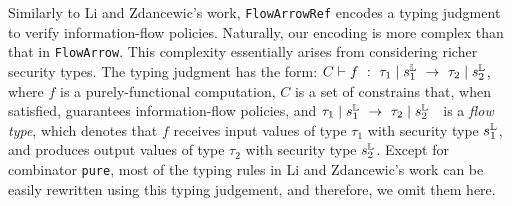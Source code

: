 \documentclass[times, 10pt,twocolumn]{article}
\begin{document}
Similarly to Li and Zdancewic's work, \texttt{FlowArrowRef}
encodes a typing judgment to verify information-flow
policies. Naturally,  our encoding is more complex than 
that in \texttt{FlowArrow}. This complexity essentially 
arises from considering richer security types.
The typing judgment has the form:
$
 C  \vdash f~:~{\tau_{1}}\mid {s_{1}^{\mathbb{L}}}~->~{\tau_{2}}\mid {s_{2}^{\mathbb{L}}}
$, 
%
where $f$ is a purely-functional computation,  
$C$ is a set of constrains
that, when satisfied, guarantees information-flow policies, and 
$\res{\typn{1}}{\sts{1}}~->~\res{\typn{2}}{\sts{2}}\ \ $ is a \emph{flow
  type}, which denotes
that $f$ receives  input values of type $\tau_1$ with
security type $s_{1}^{\mathbb{L}}$, and produces output values of type
$\tau_2$ with security type $s_{2}^{\mathbb{L}}$. Except for 
combinator \texttt{pure}, 
most of the typing rules in 
Li and Zdancewic's work can be easily rewritten using this 
typing judgement, and therefore, we omit them here. 

%
%   






%
%
%
%
\end{document}
